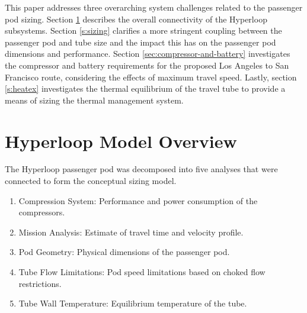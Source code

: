 \documentclass[heading.tex]{subfiles}
\begin{document}
This paper addresses three overarching system challenges related to the passenger pod sizing.
Section \ref{s:struct} describes the overall connectivity of the Hyperloop subsystems. 
Section \ref{s:sizing} clarifies a more stringent coupling between the passenger pod and tube size
and the impact this has on the passenger pod dimensions and performance. 
Section \ref{sec:compressor-and-battery} investigates the compressor and battery requirements for the
proposed Los Angeles to San Francisco route, considering the effects of maximum travel speed. 
Lastly, section \ref{s:heatex} investigates the thermal equilibrium of the
travel tube to provide a means of sizing the thermal management system. 



\section{Hyperloop Model Overview}
\label{s:struct}

The Hyperloop passenger pod was decomposed into five analyses that were connected to 
form the conceptual sizing model. 

\begin{enumerate}
  \item Compression System: Performance and power consumption of the compressors.
  \item Mission Analysis: Estimate of travel time and velocity profile.
  \item Pod Geometry: Physical dimensions of the passenger pod.
  \item Tube Flow Limitations: Pod speed limitations based on choked flow restrictions.
  \item Tube Wall Temperature: Equilibrium temperature of the tube.
\end{enumerate}
\end{document}
